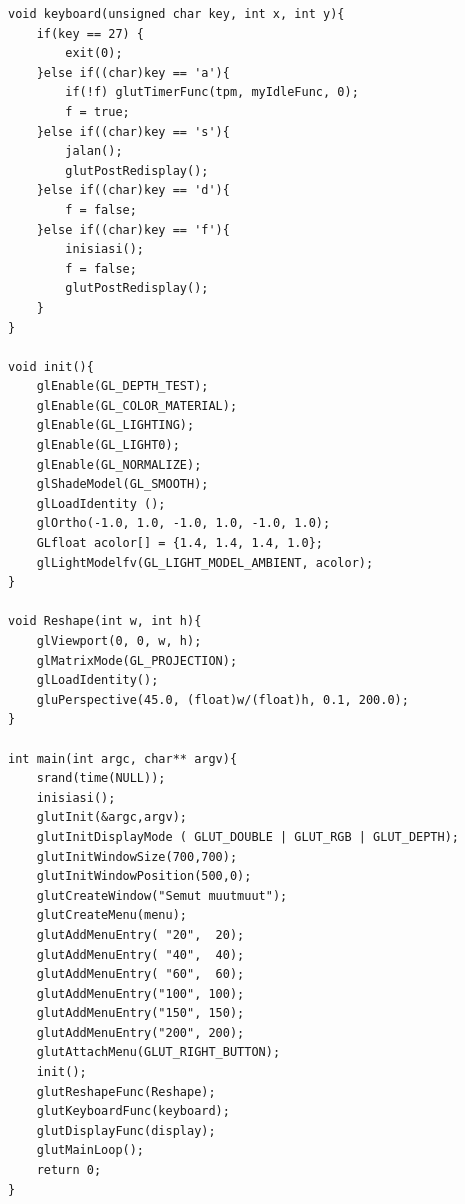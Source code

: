 \documentclass[paper=a4, fontsize=11pt]{scrartcl}
\numberwithin{equation}{section} %
\numberwithin{figure}{section} %
\numberwithin{table}{section} %
\begin{document}
\begin{lstlisting}
void keyboard(unsigned char key, int x, int y){
	if(key == 27) {		
		exit(0);	
	}else if((char)key == 'a'){
		if(!f) glutTimerFunc(tpm, myIdleFunc, 0);
		f = true;
	}else if((char)key == 's'){
		jalan();
		glutPostRedisplay();
	}else if((char)key == 'd'){
		f = false;
	}else if((char)key == 'f'){
		inisiasi();
        f = false;
		glutPostRedisplay();
    }
}

void init(){
	glEnable(GL_DEPTH_TEST);
	glEnable(GL_COLOR_MATERIAL);
	glEnable(GL_LIGHTING);
	glEnable(GL_LIGHT0);
	glEnable(GL_NORMALIZE);
	glShadeModel(GL_SMOOTH);	
	glLoadIdentity ();
	glOrtho(-1.0, 1.0, -1.0, 1.0, -1.0, 1.0);
	GLfloat acolor[] = {1.4, 1.4, 1.4, 1.0};
	glLightModelfv(GL_LIGHT_MODEL_AMBIENT, acolor);
}

void Reshape(int w, int h){
    glViewport(0, 0, w, h);
    glMatrixMode(GL_PROJECTION); 
	glLoadIdentity();
	gluPerspective(45.0, (float)w/(float)h, 0.1, 200.0);
}

int main(int argc, char** argv){
	srand(time(NULL));
    inisiasi();
	glutInit(&argc,argv);
	glutInitDisplayMode ( GLUT_DOUBLE | GLUT_RGB | GLUT_DEPTH);
	glutInitWindowSize(700,700);
	glutInitWindowPosition(500,0);
	glutCreateWindow("Semut muutmuut");
	glutCreateMenu(menu);
	glutAddMenuEntry( "20",  20);
	glutAddMenuEntry( "40",  40);
	glutAddMenuEntry( "60",  60);
	glutAddMenuEntry("100", 100);
	glutAddMenuEntry("150", 150);
	glutAddMenuEntry("200", 200);
	glutAttachMenu(GLUT_RIGHT_BUTTON);
	init();
	glutReshapeFunc(Reshape);
	glutKeyboardFunc(keyboard);
	glutDisplayFunc(display);
	glutMainLoop();
	return 0;
}
\end{lstlisting}
\end{document}

